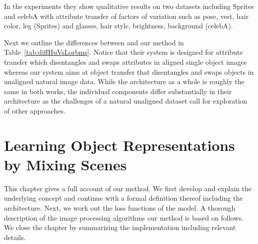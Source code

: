 \documentclass[a4paper,12pt]{report}
\begin{document}
\begin{table} [ht]
\centering
{}
\caption{Differences between \cite{DisentFacOfVarByMixTh} and our method.} \label{tab:diffHuVsLorbms}
\end{table}

In the experiments they show qualitative results on two datasets including Sprites and celebA with attribute transfer of factors of variation such as pose, vest, hair color, leg (Sprites) and glasses, hair style, brightness, background (celebA).

Next we outline the differences between \cite{DisentFacOfVarByMixTh} and our method in Table~\ref{tab:diffHuVsLorbms}. Notice that their system is designed for attribute transfer which disentangles and swaps attributes in aligned single object images whereas our system aims at object transfer that disentangles and swaps objects in unaligned natural image data. While the architecture as a whole is roughly the same in both works, the individual components differ substantially in their architecture as the challenges of a natural unaligned dataset call for exploration of other approaches.


%
\chapter{Learning Object Representations by Mixing Scenes}\label{sec:lorbms_method}
This chapter gives a full account of our method. We first develop and explain the underlying concept and continue with a formal definition thereof including the architecture. Next, we work out the loss functions of the model. A thorough description of the image processing algorithms our method is based on follows. We close the chapter by summarizing the implementation including relevant details. 
\end{document}
